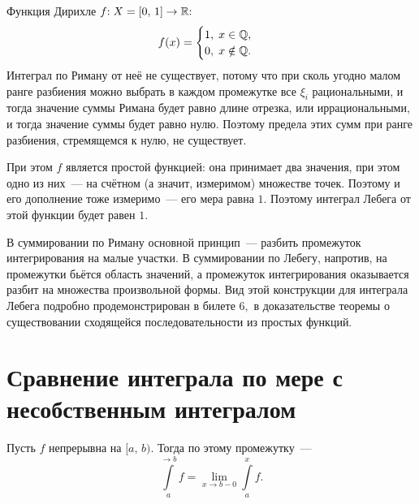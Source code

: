 \documentclass{notes}
\begin{document}
	\begin{exm}
		Функция Дирихле $f\text{\text{:}} \; X = [0, \, 1] \to \mathbb{R}\text{\text{:}}$
		\[
			f(x) = \begin{cases}
				1, \; x \in \mathbb{Q}, \\
				0, \; x \notin \mathbb{Q}.
			\end{cases}
		\]
		Интеграл по Риману от неё не существует, потому что при сколь угодно малом ранге разбиения можно выбрать в каждом промежутке все $\xi_i$ рациональными, и тогда значение суммы Римана будет равно длине отрезка, или иррациональными, и тогда значение суммы будет равно нулю. Поэтому предела этих сумм при ранге разбиения, стремящемся к нулю, не существует.

		При этом $f$ является простой функцией: она принимает два значения, при этом одно из них~--- на счётном (а значит, измеримом) множестве точек. Поэтому и его дополнение тоже измеримо~--- его мера равна $1$. Поэтому интеграл Лебега от этой функции будет равен $1$.

		В суммировании по Риману основной принцип~--- разбить промежуток интегрирования на малые участки. В суммировании по Лебегу, напротив, на промежутки бьётся область значений, а промежуток интегрирования оказывается разбит на множества произвольной формы. Вид этой конструкции для интеграла Лебега подробно продемонстрирован в билете $6,$ в доказательстве теоремы о существовании сходящейся последовательности из простых функций.
	\end{exm}

\section{Сравнение интеграла по мере с несобственным интегралом}

	\begin{de}[Напоминание]
		Пусть $f$ непрерывна на $[a, \, b)$. Тогда  по этому промежутку~---
		\[
			\int\limits_a^{\to b} f = \lim\limits_{x \to b-0} \int\limits_a^{x} f.
		\]
	\end{de}
\end{document}

